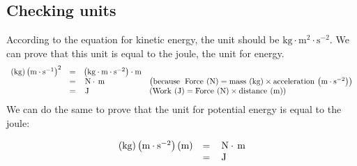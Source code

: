\subsection*{Checking units}
            \nopagebreak
        \label{m38785*id67277}According to the equation for kinetic energy, the unit should be $\text{kg}\ensuremath{\cdot}\text{m}{}^{2}\ensuremath{\cdot}\text{s}{}^{-2}$. We can prove that this unit is equal to the joule, the unit for energy.
        \label{m38785*id67329}\nopagebreak\noindent{}
    \begin{equation*}
    \begin{array}{cccc}\hfill \left(\text{kg}\right){\left(\text{m}\ensuremath{\cdot}{\text{s}}^{-1}\right)}^{2}& =& \left(\text{kg}\ensuremath{\cdot}\text{m}\ensuremath{\cdot}{\text{s}}^{-2}\right)\ensuremath{\cdot}\text{m}\hfill & \\ & =& \phantom{\rule{0.166667em}{0ex}}\text{N}\ensuremath{\cdot}\phantom{\rule{0.166667em}{0ex}}\text{m}\hfill & \left(\text{because\; Force}\phantom{\rule{2pt}{0ex}}\left(\text{N}\right)=\text{mass}\phantom{\rule{2pt}{0ex}}\left(\text{kg}\right)\ensuremath{\times}\text{acceleration}\phantom{\rule{2pt}{0ex}}\left(\text{m}\ensuremath{\cdot}{\text{s}}^{-2}\right)\right)\hfill \\ & =& \phantom{\rule{0.166667em}{0ex}}\text{J}\hfill & \left(\text{Work}\phantom{\rule{2pt}{0ex}}\left(\text{J}\right)=\text{Force}\phantom{\rule{2pt}{0ex}}\left(\text{N}\right)\ensuremath{\times}\text{distance}\phantom{\rule{2pt}{0ex}}\left(\text{m}\right)\right)\hfill \end{array}
      \end{equation*}
        \label{m38785*id67613}We can do the same to prove that the unit for potential energy is equal to the joule:
        \label{m38785*id67619}\nopagebreak\noindent{}
          
    \begin{equation*}
    \begin{array}{ccc}\hfill \left(\text{kg}\right)\left(\text{m}\ensuremath{\cdot}{\text{s}}^{-2}\right)\left(\text{m}\right)& =& \phantom{\rule{0.166667em}{0ex}}\text{N}\ensuremath{\cdot}\phantom{\rule{0.166667em}{0ex}}\text{m}\hfill \\ & =& \phantom{\rule{0.166667em}{0ex}}\text{J}\hfill \end{array}
      \end{equation*}
\par
            \label{m38785*secfhsst!!!underscore!!!id1394}

